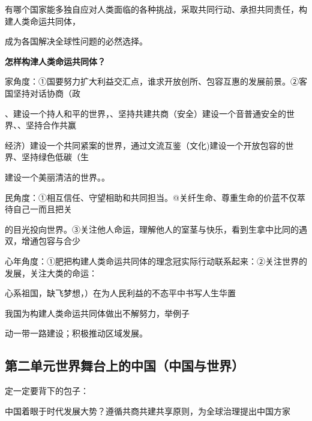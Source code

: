 \documentclass[lang=cn,11pt]{elegantbook}
\newcommand{\daofasym}[1]{{\daofasymbolfont #1}}
\newcommand{\daofasym}[1]{#1}
\begin{document}
有哪个国家能多独自应对人类面临的各种挑战，采取共同行动、承担共同责任，构建人类命运共同体，\par

成为各国解决全球性问题的必然选择。\par

\textbf{怎样构津人类命运共同体？}\par

家角度：\daofasym{①}国要努力扩大利益交汇点，谁求开放创所、包容互惠的发展前景。\daofasym{②}客国坚持对话协商（政\par

、建设一个持人和平的世界，、坚持共建共商（安全）建设一个音普通安全的世界、、坚持合作共赢\par

经济）建设一个共同紧案的世界，通过文流互鉴（文化)建设一个开放包容的世界、坚持绿色低碳（生\par

建设一个美丽清洁的世界。。\par

民角度：\daofasym{①}相互信任、守望相助和共同担当。@关纤生命、尊重生命的价蓝不仅萃待自己一而且把关\par

的目光投向世界。\daofasym{③}关注他人命运，理解他人的室茎与快乐，看到生拿中比同的遇双，增通包容与合少\par

心年角度：\daofasym{①}肥把构建人类命运共同体的理念冠实际行动联系起来：\daofasym{②}关注世界的发展，关注大类的命运：\par

心系祖国，缺飞梦想，）在为人民利益的不态平中书写人生华置\par

我国为构建人类命运共同体做出不解努力，举例子\par

动一带一路建设；积极推动区域发展。\par

\subsection*{第二单元世界舞台上的中国（中国与世界）}

定一定要背下的包子：\par

中国着眼于时代发展大势？遵循共商共建共享原则，为全球治理提出中国方家\par
\end{document}
